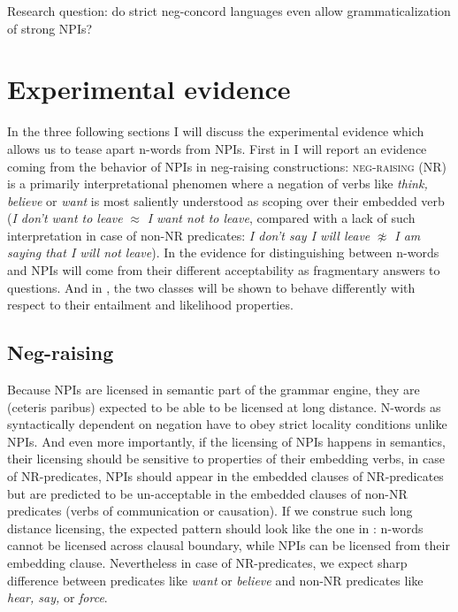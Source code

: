 \documentclass[output=paper,
]{langscibook}
\begin{document}
\eanoraggedright\label{ex-23} Research question: do strict neg-concord languages even allow grammaticalization of strong NPIs?
\z

\section{Experimental evidence}\label{experimental-evidence}

In the three following sections I will discuss the experimental evidence which allows us to tease apart n-words from NPIs. First in  I will report an evidence coming from the behavior of NPIs in neg-raising constructions: \textsc{neg-raising} (NR) is a primarily interpretational phenomen where a negation of verbs like \textit{think, believe} or \textit{want} is most saliently understood as scoping over their embedded verb (\textit{I don't want to leave} $\approx$ \textit{I want not to leave}, compared with a lack of such interpretation in case of non-NR predicates: \textit{I don't say I will leave} $\not\approx$ \textit{I am saying that I will not leave}). In  the evidence for distinguishing between n-words and NPIs will come from their different acceptability as fragmentary answers to questions. And in , the two classes will be shown to behave differently with respect to their entailment and likelihood properties.

\subsection{Neg-raising}\label{neg-raising}

Because NPIs are licensed in semantic part of the grammar engine, they are (ceteris paribus) expected to be able to be licensed at long distance. N-words as syntactically dependent on negation have to obey strict locality conditions unlike NPIs. And even more importantly, if the licensing of NPIs happens in semantics, their licensing should be sensitive to properties of their embedding verbs, in case of NR-predicates, NPIs should appear in the embedded clauses of NR-predicates but are predicted to be un-acceptable in the embedded clauses of non-NR predicates (verbs of communication or causation). If we construe such long distance licensing, the expected pattern should look like the one in : n-words cannot be licensed across clausal boundary, while NPIs can be licensed from their embedding clause. Nevertheless in case of NR-predicates, we expect sharp difference between predicates like \textit{want} or \textit{believe} and non-NR predicates like \textit{hear, say,} or \textit{force}.
\end{document}

